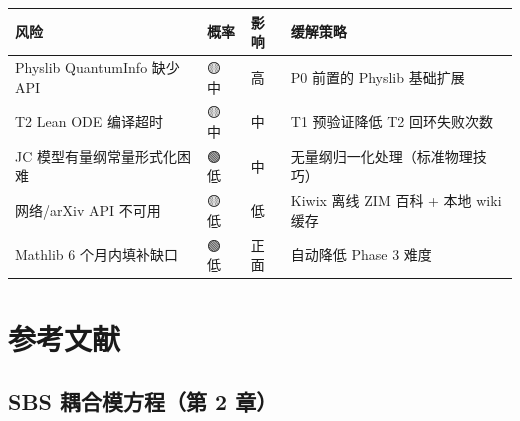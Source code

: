 \documentclass[
  11pt,
  a4paper,
]{ctexrep}
\newcounter{none} %
\begin{document}
{\def\LTcaptype{none} %
\begin{longtable}[]{@{}
  >{\raggedright\arraybackslash}p{}
  >{\centering\arraybackslash}p{}
  >{\centering\arraybackslash}p{}
  >{\raggedright\arraybackslash}p{}@{}}
\toprule\noalign{}
\begin{minipage}[b]{\linewidth}\raggedright
风险
\end{minipage} & \begin{minipage}[b]{\linewidth}\centering
概率
\end{minipage} & \begin{minipage}[b]{\linewidth}\centering
影响
\end{minipage} & \begin{minipage}[b]{\linewidth}\raggedright
缓解策略
\end{minipage} \\
\midrule\noalign{}
\endhead
\bottomrule\noalign{}
\endlastfoot
Physlib QuantumInfo 缺少 API & 🟡 中 & 高 & P0 前置的 Physlib
基础扩展 \\
T2 Lean ODE 编译超时 & 🟡 中 & 中 & T1 预验证降低 T2 回环失败次数 \\
JC 模型有量纲常量形式化困难 & 🟢 低 & 中 &
无量纲归一化处理（标准物理技巧） \\
网络/arXiv API 不可用 & 🟡 低 & 低 & Kiwix 离线 ZIM 百科 + 本地 wiki
缓存 \\
Mathlib 6 个月内填补缺口 & 🟢 低 & 正面 & 自动降低 Phase 3 难度 \\
\end{longtable}
}


\chapter*{参考文献}\label{ux53c2ux8003ux6587ux732e}


\section*{SBS 耦合模方程（第 2
章）}\label{sbs-ux8026ux5408ux6a21ux65b9ux7a0bux7b2c-2-ux7ae0}

\end{document}
